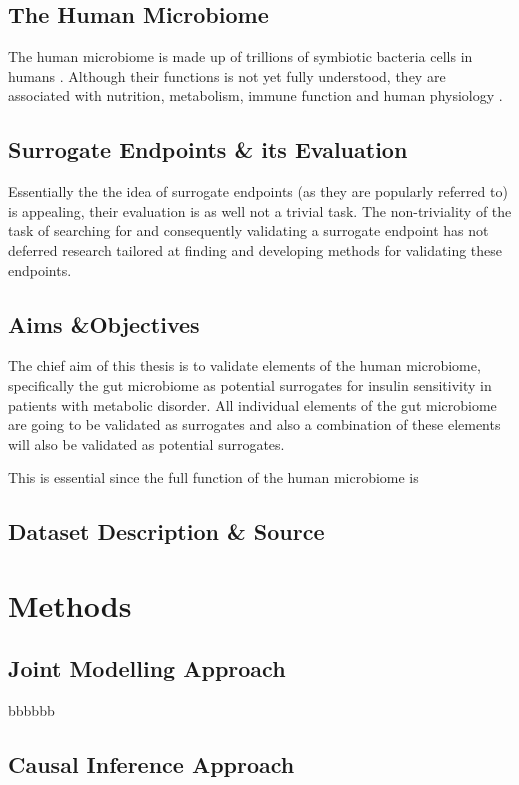 \documentclass[a4paper,12pt]{article}\usepackage[]{graphicx}\usepackage[]{color}
\begin{document}
\subsection{The Human Microbiome}
The human microbiome is made up of trillions of symbiotic bacteria cells in humans \citep{ursell}. Although their functions is not yet fully understood, they are associated with nutrition, metabolism, immune function and human physiology \citep{bull}.

\subsection{Surrogate Endpoints \& its Evaluation}
Essentially the the idea of surrogate endpoints (as they are popularly referred to) is appealing, their evaluation is as well not a trivial task\citep{surrogate2}. The non-triviality of the task of searching for and consequently validating a surrogate endpoint has not deferred research tailored at finding and developing methods for validating these endpoints\citep{surrogate2, surrogate3,surrogate1}. 

\subsection{Aims \&Objectives}
The chief aim of this thesis is to validate elements of the human microbiome, specifically the gut microbiome as potential surrogates for insulin sensitivity in patients with metabolic disorder. All individual elements of the gut microbiome are going to be validated as surrogates and also a combination of these elements will also be validated as potential surrogates. 

This is essential since the full function of the human microbiome is 

\subsection{Dataset Description \& Source}

\section{Methods}

\subsection{Joint Modelling Approach}
bbbbbb \citep{surrogate1}
\subsection{Causal Inference Approach}
\end{document}
